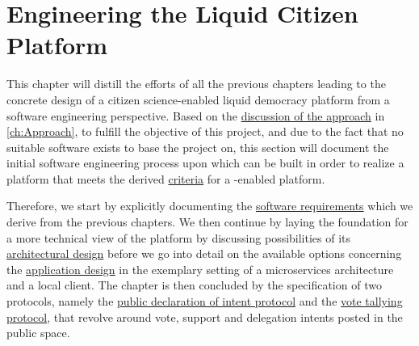 \chapter{Engineering the Liquid Citizen Platform}
\label{ch:ProjectRequirements}
This chapter will distill the efforts of all the previous chapters leading to the concrete design of a citizen science-enabled liquid 
democracy platform from a software engineering perspective.
Based on the \hyperref[ch:Approach]{discussion of the approach} in \autoref{ch:Approach}, to fulfill the objective of this project, and due to the fact that no suitable software exists to base the project on, this section will document the initial software engineering process upon which can be built in order to realize a platform that meets the derived \hyperref[sec:Criteria]{criteria} for a -enabled  platform.

Therefore, we start by explicitly documenting the \hyperref[sec:SoftwareRequirements]{software requirements} which we derive from the previous chapters.
We then continue by laying the foundation for a more technical view of the platform by discussing possibilities of its \hyperref[sec:ArchitecturalDesign]{architectural design} before we go into detail on the available options concerning the \hyperref[sec:ApplicationDesign]{application design} in the exemplary setting of a microservices architecture and a local client.
The chapter is then concluded by the specification of two protocols, namely the \hyperref[sec:PublicDeclarationOfIntentProtocol]{public declaration of intent protocol} and the \hyperref[sec:VoteTallyingProtocol]{vote tallying protocol}, that revolve around vote, support and delegation intents posted in the public space.






